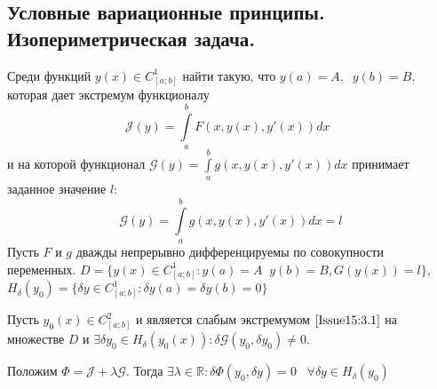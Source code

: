 \subsection{Условные вариационные принципы. Изопериметрическая задача.}
Среди функций $y(x)\in C^1_{[a;b]}$ найти такую, что $y(a)=A,\;\; y(b)=B$, которая дает экстремум функционалу 
\begin{equation}
	\mathcal{J}(y)=\int\limits_a^b F(x,y(x),y'(x))dx\;\;
	\label{Issue15:3.1}
\end{equation} 
и на которой функционал $\mathcal{G}(y) = \int\limits_a^b g(x,y(x),y'(x))dx$ принимает заданное значение $l$:
\begin{equation}
	\label{Issue15:3.2}
	\mathcal{G}(y)=\int\limits_a^b g(x,y(x),y'(x))d x=l
\end{equation}
Пусть $F$ и $g$ дважды непрерывно дифференцируемы по совокупности переменных. $D=\{y(x)\in C^1_{[a;b]}:y(a)=A\;\;y(b)=B, G(y(x))=l\}$, 
$H_\delta (y_0)=\{\delta y \in C^1_{[a;b]}:\delta y (a) = \delta  y(b)=0\}$
\begin{theorem}
	Пусть $y_0(x)\in C^2_{[a;b]}$ и является слабым экстремумом $\eqref{Issue15:3.1}$ на множестве $D$ и $\exists \delta y_0\in H_\delta (y_0(x)): \delta \mathcal{G}(y_0,\delta y_0)\neq 0.$
	
	Положим $\Phi =\mathcal{J}+\lambda\mathcal{G}.$ Тогда $\exists \lambda \in \mathds{R}: \delta \Phi(y_0,\delta y)=0\;\;\;\forall \delta y\in H_\delta(y_0)$
\end{theorem}
